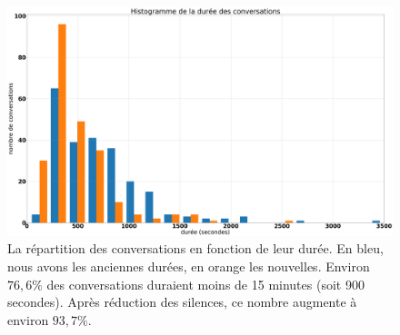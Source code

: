 \begin{figure}[h]
  \centering
  \includegraphics[width=15cm]{./Chapitre4/figures/repart.png}
  \caption{La répartition des conversations en fonction de leur durée. En bleu, nous avons les anciennes durées, en orange les nouvelles. Environ $76,6\%$ des conversations duraient moins de 15 minutes (soit 900 secondes). Après réduction des silences, ce nombre augmente à environ $93,7\%$.}
  \label{fig:repart}
\end{figure}
